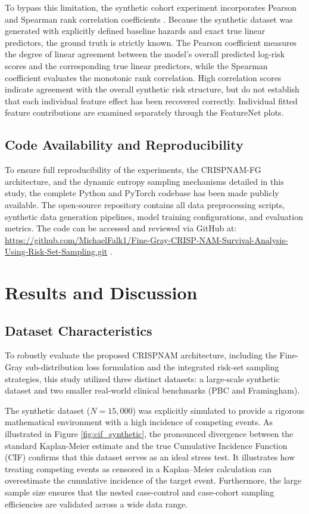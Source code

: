 \documentclass[a4paper,twoside,12pt]{report}
\begin{document}
To bypass this limitation, the synthetic cohort experiment incorporates Pearson and Spearman rank correlation coefficients \citep{rosner2015fundamentals}. Because the synthetic dataset was generated with explicitly defined baseline hazards and exact true linear predictors, the ground truth is strictly known. The Pearson coefficient measures the degree of linear agreement between the model's overall predicted log-risk scores and the corresponding true linear predictors, while the Spearman coefficient evaluates the monotonic rank correlation. High correlation scores indicate agreement with the overall synthetic risk structure, but do not establish that each individual feature effect has been recovered correctly. Individual fitted feature contributions are examined separately through the FeatureNet plots.

\section{Code Availability and Reproducibility}
To ensure full reproducibility of the experiments, the CRISPNAM-FG architecture, and the dynamic entropy sampling mechanisms detailed in this study, the complete Python and PyTorch codebase has been made publicly available. The open-source repository contains all data preprocessing scripts, synthetic data generation pipelines, model training configurations, and evaluation metrics. The code can be accessed and reviewed via GitHub at:
\url{https://github.com/MichaelFalk1/Fine-Gray-CRISP-NAM-Survival-Analysis-Using-Risk-Set-Sampling.git} \citep{falk2026crispnam}.


\chapter{Results and Discussion}
\section{Dataset Characteristics}

To robustly evaluate the proposed CRISPNAM architecture, including the Fine-Gray sub-distribution loss formulation and the integrated risk-set sampling strategies, this study utilized three distinct datasets: a large-scale synthetic dataset and two smaller real-world clinical benchmarks (PBC and Framingham).

The synthetic dataset ($N = 15,000$) was explicitly simulated to provide a rigorous mathematical environment with a high incidence of competing events. As illustrated in Figure \ref{fig:cif_synthetic}, the pronounced divergence between the standard Kaplan-Meier estimate and the true Cumulative Incidence Function (CIF) confirms that this dataset serves as an ideal stress test. It illustrates how treating competing events as censored in a Kaplan--Meier calculation can overestimate the cumulative incidence of the target event. Furthermore, the large sample size ensures that the nested case-control and case-cohort sampling efficiencies are validated across a wide data range.
\end{document}
